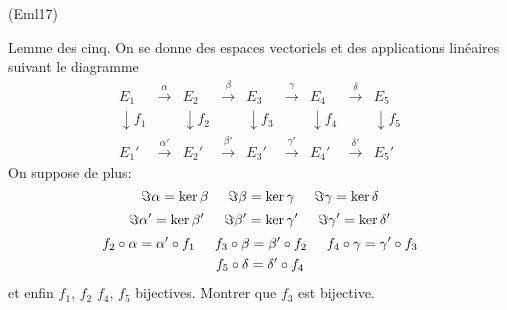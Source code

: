\begin{tiny}(Eml17)\end{tiny} Lemme des cinq.\newline
On se donne des espaces vectoriels et des applications linéaires suivant le diagramme
\begin{displaymath}
  \begin{array}{lllllllll}
    E_1 & \xrightarrow{\alpha}  & E_2  & \xrightarrow{\beta}  & E_3 & \xrightarrow{\gamma}   & E_4  & \xrightarrow{\delta}  & E_5 \\ 
\downarrow f_1&     &\downarrow  f_2  &             &\downarrow f_3 &               &\downarrow f_4 &                    &\downarrow f_5  \\
    E_1' & \xrightarrow{\alpha'} & E_2' & \xrightarrow{\beta'} & E_3' & \xrightarrow{\gamma'} & E_4' & \xrightarrow{\delta'} & E_5' 
  \end{array}
\end{displaymath}
On suppose de plus: 
\begin{displaymath}
\Im \alpha = \ker \beta\hspace{0.5cm}  \Im \beta = \ker \gamma \hspace{0.5cm} \Im \gamma = \ker \delta  
\end{displaymath}
\begin{displaymath}
\Im \alpha' = \ker \beta' \hspace{0.5cm}\Im \beta' = \ker \gamma' \hspace{0.5cm}\Im \gamma' = \ker \delta'  
\end{displaymath}
\begin{multline*}
f_2 \circ \alpha = \alpha' \circ f_1 \hspace{0.5cm}
f_3 \circ \beta = \beta' \circ f_2 \hspace{0.5cm}
f_4 \circ \gamma = \gamma' \circ f_3 \\
f_5 \circ \delta = \delta' \circ f_4
\end{multline*}
et enfin $f_1$, $f_2$ $f_4$, $f_5$ bijectives.\newline
Montrer que $f_3$ est bijective.